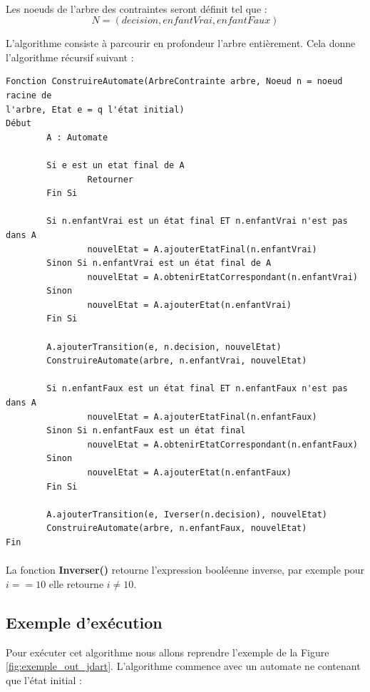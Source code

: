 \paragraph{}
Les noeuds de l'arbre des contraintes seront définit tel que :
$$ N = (decision, enfantVrai, enfantFaux)$$


L'algorithme consiste à parcourir en profondeur l'arbre entièrement.
Cela donne l'algorithme récursif suivant :

\newpage
\begin{verbatim}
Fonction ConstruireAutomate(ArbreContrainte arbre, Noeud n = noeud racine de 
l'arbre, Etat e = q l'état initial)
Début
        A : Automate
	
        Si e est un etat final de A
                Retourner 
        Fin Si
        
        Si n.enfantVrai est un état final ET n.enfantVrai n'est pas dans A
                nouvelEtat = A.ajouterEtatFinal(n.enfantVrai)
        Sinon Si n.enfantVrai est un état final de A
                nouvelEtat = A.obtenirEtatCorrespondant(n.enfantVrai)
        Sinon
                nouvelEtat = A.ajouterEtat(n.enfantVrai)
        Fin Si
	
        A.ajouterTransition(e, n.decision, nouvelEtat)
        ConstruireAutomate(arbre, n.enfantVrai, nouvelEtat)

        Si n.enfantFaux est un état final ET n.enfantFaux n'est pas dans A
                nouvelEtat = A.ajouterEtatFinal(n.enfantFaux)
        Sinon Si n.enfantFaux est un état final
                nouvelEtat = A.obtenirEtatCorrespondant(n.enfantFaux)
        Sinon
                nouvelEtat = A.ajouterEtat(n.enfantFaux)
        Fin Si
	
        A.ajouterTransition(e, Iverser(n.decision), nouvelEtat)
        ConstruireAutomate(arbre, n.enfantFaux, nouvelEtat)
Fin
\end{verbatim}

\paragraph{}
La fonction \textbf{Inverser()} retourne l'expression booléenne inverse, par 
exemple pour $i == 10$ elle retourne $i \ne 10$. 

\subsection{Exemple d'exécution}

Pour exécuter cet algorithme nous allons reprendre l'exemple de la Figure 
\ref{fig:exemple_out_jdart}. L'algorithme commence avec un automate ne 
contenant que l'état initial :

